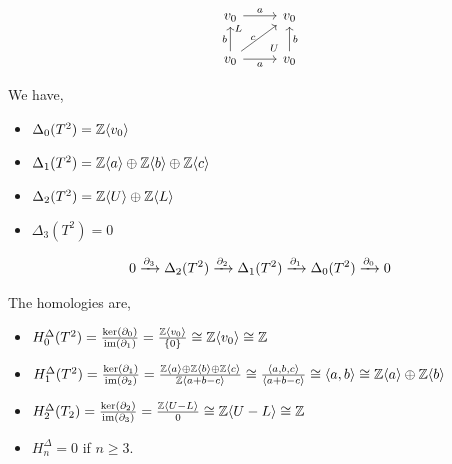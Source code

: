 \documentclass[12pt]{amsart}
\begin{document}
\begin{example}
    \bbni

    \[
    \begin{tikzcd}
    v_0 \arrow[r,"a"]  & v_0 \\
    v_0 \arrow[u,"b"] \arrow[r,swap,"a"] \arrow[ur,"c"{yshift = -.05in}] \arrow[ur, phantom, "\scriptstyle L"{yshift=0.1in, xshift=-.2in}] & v_0 \arrow[u,swap,"b"] \arrow[ul, phantom, "\scriptstyle U", very near start]
    \end{tikzcd}
    \]

    We have, 
    \begin{itemize}
        \item $\Delta_0(T^2) = \mathbb Z \langle v_0 \rangle$ 
        \item $\Delta_1(T^2) = \mathbb Z \langle a \rangle \oplus \mathbb Z \langle b \rangle \oplus \mathbb Z \langle c \rangle $ 
        \item $\Delta_2(T^2) = \mathbb Z \langle U \rangle \oplus \mathbb Z \langle L \rangle$ 
        \item $\Delta_3(T^2) = 0$
    \end{itemize}

    \[0 \xrightarrow{\partial_3} \Delta_2(T^2) \xrightarrow{\partial_2} \Delta_1(T^2) \xrightarrow{\partial_1} \Delta_0 (T^2) \xrightarrow{\partial_0} 0\]

    The homologies are, 
     \begin{itemize}
        \item $H_0^\Delta(T^2) = \frac{\ker(\partial_0)}{\operatorname{im}(\partial_1)} =  \frac{\mathbb Z\langle v_0 \rangle}{\{0\}} \cong \mathbb Z\langle v_0 \rangle \cong \mathbb Z$
        
        \item $H_1^\Delta(T^2) = \frac{\ker(\partial_1)}{\operatorname{im}(\partial_2)} =  \frac{\mathbb Z\langle a \rangle \oplus \mathbb Z \langle b \rangle \oplus \mathbb Z \langle c \rangle}{ \mathbb Z\langle a + b - c \rangle} \cong  \frac{\langle a, b, c \rangle }{ \langle a + b - c\rangle} \cong \langle a, b \rangle \cong \mathbb Z\langle a \rangle \oplus \mathbb Z\langle b \rangle$
        
        \item $H^\Delta_2(T_2) = \frac{\ker(\partial_2)}{\operatorname{im}(\partial_3)} = \frac{\mathbb Z\langle U - L \rangle }{ 0} \cong \mathbb Z\langle U - L \rangle \cong \mathbb Z $

        \item $H_n^\Delta = 0$ if $n \geq 3$. 
    \end{itemize}
\end{example}
\end{document}
